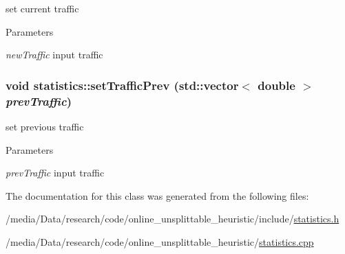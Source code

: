 set current traffic 


\begin{DoxyParams}{Parameters}
\item[{\em newTraffic}]input traffic \end{DoxyParams}
\hypertarget{classstatistics_ae5d56a6dc6878004b42d10369de284de}{
\subsubsection[{setTrafficPrev}]{\setlength{\rightskip}{0pt plus 5cm}void statistics::setTrafficPrev (std::vector$<$ double $>$ {\em prevTraffic})}}
\label{classstatistics_ae5d56a6dc6878004b42d10369de284de}


set previous traffic 


\begin{DoxyParams}{Parameters}
\item[{\em prevTraffic}]input traffic \end{DoxyParams}


The documentation for this class was generated from the following files:\begin{DoxyCompactItemize}
\item 
/media/Data/research/code/online\_\-unsplittable\_\-heuristic/include/\hyperlink{statistics_8h}{statistics.h}\item 
/media/Data/research/code/online\_\-unsplittable\_\-heuristic/\hyperlink{statistics_8cpp}{statistics.cpp}\end{DoxyCompactItemize}
